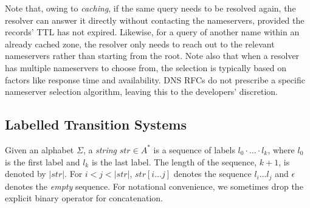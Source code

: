 Note that, owing to  \emph{caching},
if the same query needs to be resolved again, the resolver can answer it directly without contacting the nameservers, provided the records' TTL has not expired.
Likewise, for a query of another name within an already cached zone, the resolver only needs to reach out to the relevant nameservers rather than starting from the root.
Note also that when a resolver has multiple nameservers to choose from, the selection is typically based on factors like response time and availability. DNS RFCs do not prescribe a specific nameserver selection algorithm, leaving this to the developers’ discretion.
















\subsection{Labelled Transition Systems}\label{subsec:lts}
Given an alphabet $\Sigma$, a \emph{string} $str \in A^*$ is a sequence of labels $l_0 \cdot \ldots \cdot l_k$, where $l_0$ is the first label and $l_k$ is the last label. The length of the sequence, $k+1$, is denoted by $|str|$. For $i < j < |str|$, $str[i\ldots j]$ denotes the sequence $l_i\ldots l_j$ and $\epsilon$ denotes the \emph{empty} sequence.  For notational convenience, we sometimes drop the explicit binary operator for concatenation.


